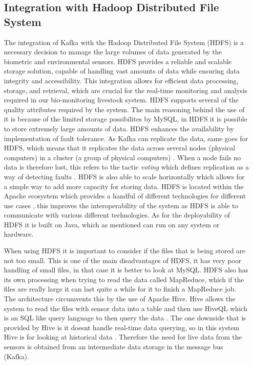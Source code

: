 \documentclass[conference]{IEEEtran}
\begin{document}
\subsection{Integration with Hadoop Distributed File System}
The integration of Kafka with the Hadoop Distributed File System (HDFS) is a necessary decision to manage the large volumes of data generated by the biometric and environmental sensors. HDFS provides a reliable and scalable storage solution, capable of handling vast amounts of data while ensuring data integrity and accessibility. This integration allows for efficient data processing, storage, and retrieval, which are crucial for the real-time monitoring and analysis required in our bio-monitoring livestock system.
HDFS supports several of the quality attributes required by the system. The main reasoning behind the use of it is because of the limited storage possibilites by MySQL, in HDFS it is possible to store extremely large amounts of data.
HDFS enhances the availability by implementation of fault tolerance. As Kafka can replicate the data, same goes for HDFS, which means that it replicates the data across several nodes (physical computers) in a cluster (a group of physical computers) \cite{AltexSoft_2022a}. When a node fails no data is therefore lost, this refers to the tactic \textit{voting} which defines replication as a way of detecting faults \cite{Bass2012Software}.
HDFS is also able to scale horizontally which allows for a simple way to add more capacity for storing data. HDFS is located within the Apache ecosystem which provides a handful of different technologies for different use cases \cite{AltexSoft_2022a}, this improves the interoperability of the system as HDFS is able to communicate with various different technologies. As for the deployability of HDFS it is built on Java, which as mentioned can run on any system or hardware.

When using HDFS it is important to consider if the files that is being stored are not too small. This is one of the main disadvantages of HDFS, it has very poor handling of small files, in that case it is better to look at MySQL.
HDFS also has its own processing when trying to read the data called MapReduce, which if the files are really large it can last quite a while for it to finish a MapReduce job. The architecture circumvents this by the use of Apache Hive. Hive allows the system to read the files with sensor data into a table and then use HiveQL which is an SQL like query language to then query the data \cite{ApacheHive}.
The one downside that is provided by Hive is it doesnt handle real-time data querying, so in this system Hive is for looking at historical data \cite{ApacheHive}. Therefore the need for live data from the sensors is obtained from an intermediate data storage in the message bus (Kafka).
\end{document}
